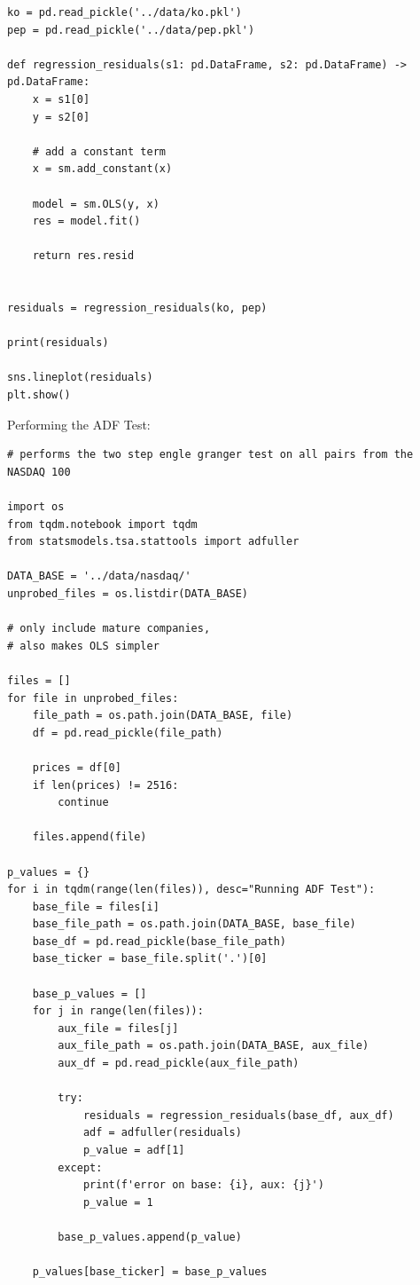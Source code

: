 \documentclass{article}
\begin{document}
\begin{spacing}{2.0}
\begin{lstlisting}
ko = pd.read_pickle('../data/ko.pkl')
pep = pd.read_pickle('../data/pep.pkl')

def regression_residuals(s1: pd.DataFrame, s2: pd.DataFrame) -> pd.DataFrame:
    x = s1[0]
    y = s2[0]

    # add a constant term
    x = sm.add_constant(x)

    model = sm.OLS(y, x)
    res = model.fit()

    return res.resid


residuals = regression_residuals(ko, pep)

print(residuals)

sns.lineplot(residuals)
plt.show()
\end{lstlisting}

Performing the ADF Test:

\begin{lstlisting}
# performs the two step engle granger test on all pairs from the NASDAQ 100

import os
from tqdm.notebook import tqdm
from statsmodels.tsa.stattools import adfuller

DATA_BASE = '../data/nasdaq/'
unprobed_files = os.listdir(DATA_BASE)

# only include mature companies,
# also makes OLS simpler

files = []
for file in unprobed_files:
    file_path = os.path.join(DATA_BASE, file)
    df = pd.read_pickle(file_path)

    prices = df[0]
    if len(prices) != 2516:
        continue

    files.append(file)

p_values = {}
for i in tqdm(range(len(files)), desc="Running ADF Test"):
    base_file = files[i]
    base_file_path = os.path.join(DATA_BASE, base_file)
    base_df = pd.read_pickle(base_file_path)
    base_ticker = base_file.split('.')[0]

    base_p_values = []
    for j in range(len(files)):
        aux_file = files[j]
        aux_file_path = os.path.join(DATA_BASE, aux_file)
        aux_df = pd.read_pickle(aux_file_path)

        try:
            residuals = regression_residuals(base_df, aux_df)
            adf = adfuller(residuals)
            p_value = adf[1]
        except:
            print(f'error on base: {i}, aux: {j}')
            p_value = 1

        base_p_values.append(p_value)

    p_values[base_ticker] = base_p_values


\end{lstlisting}
\end{spacing}
\end{document}
